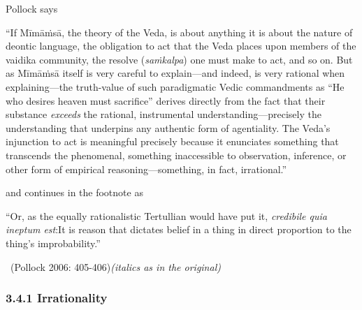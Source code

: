 Pollock says

\begin{myquote}
“If Mīmāṁsā, the theory of the Veda, is about anything it is about the nature of deontic language, the obligation to act that the Veda places upon members of the vaidika community, the resolve (\textit{saṁkalpa}) one must make to act, and so on. But as Mīmāṁsā itself is very careful to explain—and indeed, is very rational when explaining—the truth-value of such paradigmatic Vedic commandments as “He who desires heaven must sacrifice” derives directly from the fact that their substance \textit{exceeds} the rational, instrumental understanding—precisely the understanding that underpins any authentic form of agentiality. The Veda’s injunction to act is meaningful precisely because it enunciates something that transcends the phenomenal, something inaccessible to observation, inference, or other form of empirical reasoning—something, in fact, irrational.”
\end{myquote}

and continues in the footnote as

\begin{myquote}
“Or, as the equally rationalistic Tertullian would have put it, \textit{credibile quia ineptum est}:It is reason that dictates belief in a thing in direct proportion to the thing’s improbability.” 

~\hfill (Pollock 2006: 405-406)\textit{(italics as in the original)}
\end{myquote}


\subsubsection*{3.4.1 Irrationality}

